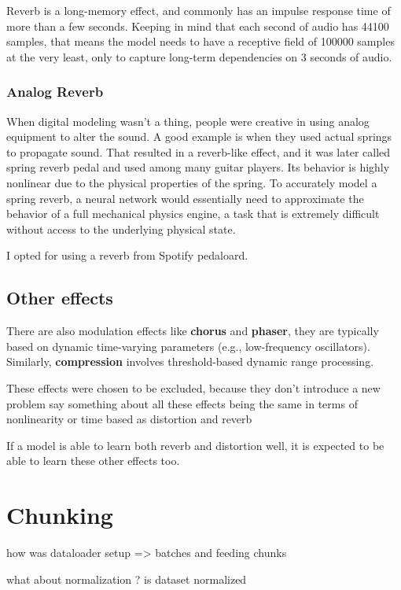 \documentclass[masterthesis]{fer}
\begin{document}
Reverb is a long-memory effect, and commonly has an impulse response time of more than a few seconds. Keeping in mind that each second of audio has 44100 samples, that means the model needs to have a receptive field of 100000 samples at the very least, only to capture long-term dependencies on 3 seconds of audio. 

\subsubsection{Analog Reverb}
When digital modeling wasn't a thing, people were creative in using analog equipment to alter the sound. A good example is when they used actual springs to propagate sound. That resulted in a reverb-like effect, and it was later called spring reverb pedal and used among many guitar players. Its behavior is highly nonlinear due to the physical properties of the spring. To accurately model a spring reverb, a neural network would essentially need to approximate the behavior of a full mechanical physics engine, a task that is extremely difficult without access to the underlying physical state.

I opted for using a reverb from Spotify pedaloard. %

\subsection{Other effects}

There are also modulation effects like \textbf{chorus} and \textbf{phaser}, they are typically based on dynamic time-varying parameters (e.g., low-frequency oscillators). Similarly, \textbf{compression} involves threshold-based dynamic range processing. 

These effects were chosen to be excluded, because they don't introduce a new problem %
say something about all these effects being the same in terms of nonlinearity or time based as distortion and reverb

If a model is able to learn both reverb and distortion well, it is expected to be able to learn these other effects too.


\section{Chunking}

how was dataloader setup => batches and feeding chunks

what about normalization ? is dataset normalized
\end{document}
